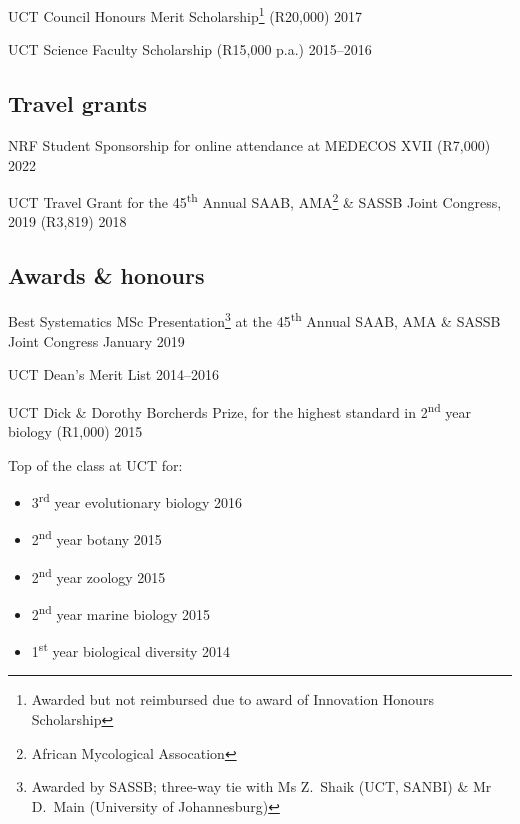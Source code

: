 \documentclass[10pt]{article}
\begin{document}
UCT Council Honours Merit Scholarship\footnote{Awarded but not
  reimbursed due to award of Innovation Honours Scholarship}
  (R20,000)                                                          \hfill 2017

UCT Science Faculty Scholarship (R15,000 p.a.)                 \hfill 2015--2016

\subsection*{Travel grants}

NRF Student Sponsorship for online attendance at MEDECOS XVII
  (R7,000)                                                           \hfill 2022

UCT Travel Grant for the 45\textsuperscript{th} Annual SAAB,
  AMA\footnote{African Mycological Assocation} \& SASSB Joint
  Congress, 2019 (R3,819)                                            \hfill 2018

\subsection*{Awards \& honours}

Best Systematics MSc Presentation\footnote{Awarded by SASSB;
  three-way tie with Ms Z.~Shaik (UCT, SANBI) \& Mr D.~Main
  (University of Johannesburg)} at the 45\textsuperscript{th}
  Annual SAAB, AMA \& SASSB Joint Congress                   \hfill January 2019

UCT Dean's Merit List                                          \hfill 2014--2016

UCT Dick \& Dorothy Borcherds Prize, for the highest standard in 
  2\textsuperscript{nd} year biology (R1,000)                        \hfill 2015

Top of the class at UCT for:

\begin{itemize}[noitemsep, nolistsep]
  \item 3\textsuperscript{rd} year evolutionary biology              \hfill 2016
  \item 2\textsuperscript{nd} year botany                            \hfill 2015
  \item 2\textsuperscript{nd} year zoology                           \hfill 2015
  \item 2\textsuperscript{nd} year marine biology                    \hfill 2015
  \item 1\textsuperscript{st} year biological diversity              \hfill 2014
\end{itemize}
\end{document}
